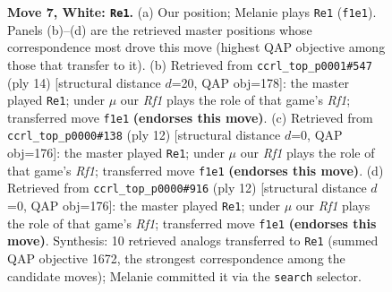 \documentclass[11pt]{article}
\begin{document}
\begin{figure}[p]
\caption{\textbf{Move 7, White: \texttt{Re1}.} (a) Our position; Melanie plays \texttt{Re1} (\texttt{f1e1}). Panels (b)--(d) are the retrieved master positions whose correspondence most drove this move (highest QAP objective among those that transfer to it). (b) Retrieved from \texttt{ccrl\_top\_p0001\#547} (ply 14) [structural distance $d$=20, QAP obj=178]: the master played \texttt{Re1}; under $\mu$ our \emph{Rf1} plays the role of that game's \emph{Rf1}; transferred move \texttt{f1e1} \textbf{(endorses this move)}. (c) Retrieved from \texttt{ccrl\_top\_p0000\#138} (ply 12) [structural distance $d$=0, QAP obj=176]: the master played \texttt{Re1}; under $\mu$ our \emph{Rf1} plays the role of that game's \emph{Rf1}; transferred move \texttt{f1e1} \textbf{(endorses this move)}. (d) Retrieved from \texttt{ccrl\_top\_p0000\#916} (ply 12) [structural distance $d$=0, QAP obj=176]: the master played \texttt{Re1}; under $\mu$ our \emph{Rf1} plays the role of that game's \emph{Rf1}; transferred move \texttt{f1e1} \textbf{(endorses this move)}. Synthesis: 10 retrieved analogs transferred to \texttt{Re1} (summed QAP objective 1672, the strongest correspondence among the candidate moves); Melanie committed it via the \texttt{search} selector.}
\label{fig:thought-m12}
\end{figure}

\clearpage
\end{document}

